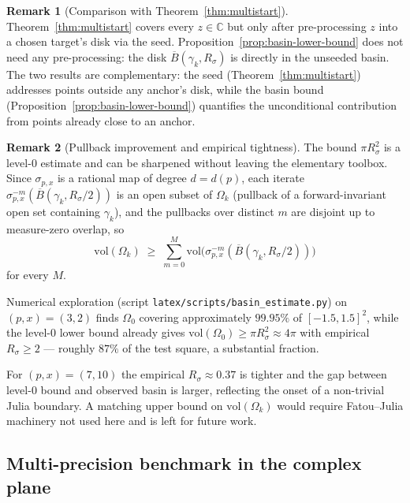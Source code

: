 \documentclass[11pt,a4paper]{article}
\theoremstyle{definition}
\newtheorem{remark}{Remark}[section]
\begin{document}
\begin{remark}[Comparison with Theorem~\ref{thm:multistart}]
Theorem~\ref{thm:multistart} covers every $z \in \mathbb{C}$ but only after pre-processing $z$ into a chosen target's disk via the seed. Proposition~\ref{prop:basin-lower-bound} does not need any pre-processing: the disk $\overline{B}(\gamma_k, R_\sigma)$ is directly in the unseeded basin. The two results are complementary: the seed (Theorem~\ref{thm:multistart}) addresses points outside any anchor's disk, while the basin bound (Proposition~\ref{prop:basin-lower-bound}) quantifies the unconditional contribution from points already close to an anchor.
\end{remark}

\begin{remark}[Pullback improvement and empirical tightness]\label{rem:pullback}
The bound $\pi R_\sigma^2$ is a level-$0$ estimate and can be sharpened without leaving the elementary toolbox. Since $\sigma_{p,x}$ is a rational map of degree $d = d(p)$, each iterate $\sigma_{p,x}^{-m}(\overline{B}(\gamma_k, R_\sigma/2))$ is an open subset of $\Omega_k$ (pullback of a forward-invariant open set containing $\gamma_k$), and the pullbacks over distinct $m$ are disjoint up to measure-zero overlap, so
\[
  \mathrm{vol}(\Omega_k) \;\geq\; \sum_{m=0}^{M} \mathrm{vol}\!\bigl(\sigma_{p,x}^{-m}(\overline{B}(\gamma_k, R_\sigma/2))\bigr)
\]
for every $M$.

Numerical exploration (script \texttt{latex/scripts/basin\_estimate.py}) on $(p, x) = (3, 2)$ finds $\Omega_0$ covering approximately $99.95\%$ of $[-1.5, 1.5]^2$, while the level-$0$ lower bound already gives $\mathrm{vol}(\Omega_0) \geq \pi R_\sigma^2 \approx 4\pi$ with empirical $R_\sigma \geq 2$ --- roughly $87\%$ of the test square, a substantial fraction.

For $(p, x) = (7, 10)$ the empirical $R_\sigma \approx 0.37$ is tighter and the gap between level-$0$ bound and observed basin is larger, reflecting the onset of a non-trivial Julia boundary. A matching upper bound on $\mathrm{vol}(\Omega_k)$ would require Fatou--Julia machinery not used here and is left for future work.
\end{remark}

\subsection{Multi-precision benchmark in the complex plane}
\label{sec:benchmark-complex}
\end{document}
